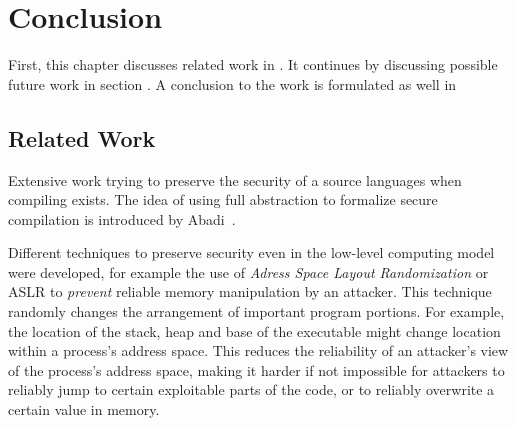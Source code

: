 \chapter{Conclusion}
\label{chap:conclusion}
First, this chapter discusses related work in .
It continues by discussing possible future work in section .
A conclusion to the work is formulated as well in 

\section{Related Work}
\label{sec:relatedwork}
Extensive work trying to preserve the security of a source languages when compiling exists.
The idea of using full abstraction to formalize secure compilation is introduced by Abadi~\cite{Abadi}.

Different techniques to preserve security even in the low-level computing model were developed, for example the use of \emph{Adress Space Layout Randomization} or ASLR to \emph{prevent} reliable memory manipulation by an attacker.
This technique randomly changes the arrangement of important program portions.
For example, the location of the stack, heap and base of the executable might change location within a process's address space.
This reduces the reliability of an attacker's view of the process's address space, making it harder if not impossible for attackers to reliably jump to certain exploitable parts of the code, or to reliably overwrite a certain value in memory.

